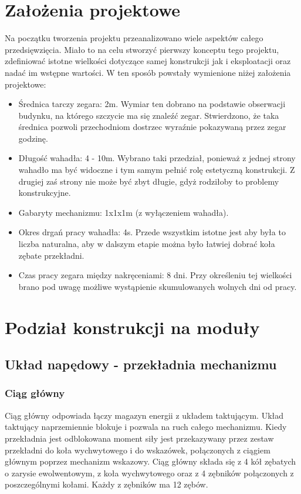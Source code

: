     \section{Założenia projektowe}
    Na początku tworzenia projektu przeanalizowano wiele aspektów całego przedsięwzięcia.
    Miało to na celu stworzyć pierwszy konceptu tego projektu, zdefiniować istotne wielkości dotyczące samej konstrukcji jak i eksploatacji oraz nadać im wstępne wartości.
    W ten sposób powstały wymienione niżej założenia projektowe:
    \begin{itemize}
    	\item Średnica tarczy zegara: 2m. 
    	Wymiar ten dobrano na podstawie obserwacji budynku, na którego szczycie ma się znaleźć zegar.
    	Stwierdzono, że taka średnica pozwoli przechodniom dostrzec wyraźnie pokazywaną przez zegar godzinę.
    	\item Długość wahadła: 4 - 10m.
    	Wybrano taki przedział, ponieważ z jednej strony wahadło ma być widoczne i tym samym pełnić rolę estetyczną konstrukcji.
    	Z drugiej zaś strony nie może być zbyt długie, gdyż rodziłoby to problemy konstrukcyjne.
    	\item Gabaryty mechanizmu: 1x1x1m (z wyłączeniem wahadła).
    	\item Okres drgań pracy wahadła: 4s.
    	Przede wszystkim istotne jest aby była to liczba naturalna, aby w dalszym etapie można było łatwiej dobrać koła zębate przekładni.
    	\item Czas pracy zegara między nakręceniami: 8 dni.
    	Przy określeniu tej wielkości brano pod uwagę możliwe wystąpienie skumulowanych wolnych dni od pracy.
    	
    \end{itemize}

    \section{Podział konstrukcji na moduły}
        \subsection{Układ napędowy - przekładnia mechanizmu}
           \subsubsection{Ciąg główny}
           		Ciąg główny odpowiada łączy magazyn energii z układem taktującym.
           		Układ taktujący naprzemiennie blokuje i pozwala na ruch całego mechanizmu.
           		Kiedy przekładnia jest odblokowana moment siły jest przekazywany przez zestaw przekładni do koła wychwytowego i do wskazówek, połączonych z ciągiem głównym poprzez mechanizm wskazowy.
           		Ciąg główny składa się z 4 kół zębatych o zarysie ewolwentowym, z koła wychwytowego oraz z 4 zębników połączonych z poszczególnymi kołami.
  				Każdy z zębników ma 12 zębów.
  				
